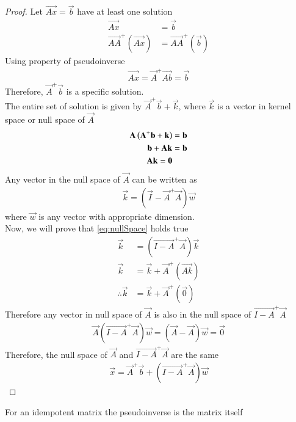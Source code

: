 \documentclass[journal,12pt,twocolumn]{IEEEtran}
\begin{document}
\begin{proof}
Let $\vec{Ax}=\vec{b}$ have at least one solution
\begin{align}
    \vec{Ax}&=\vec{b}\\
    \vec{AA}^+(\vec{Ax})&=\vec{AA}^+(\vec{b})
\end{align}
Using property of pseudoinverse
\begin{align}
    \vec{Ax}=\vec{A}^+\vec{Ab}=\vec{b}
\end{align}
Therefore, $\vec{A}^+\vec{b}$ is a specific solution.\\
The entire set of solution is given by $\vec{A}^+\vec{b}+\vec{k}$, where $\vec{k}$ is a vector in kernel space or null space of $\vec{A}$
\begin{align}
    \mathbf{A}\left(\mathbf{A}^+\mathbf{b}+\mathbf{k}\right)&=\mathbf{b}\\
    \mathbf{b}+\mathbf{Ak}&=\mathbf{b}\\
    \mathbf{Ak}=\mathbf{0}
\end{align}
Any vector in the null space of $\vec{A}$ can be written as
\begin{align}
    \vec{k}=(\vec{I}-\vec{A}^+\vec{A})\vec{w} \label{eq:nullSpace}
\end{align}
where $\vec{w}$ is any vector with appropriate dimension.\\
Now, we will prove that \eqref{eq:nullSpace} holds true
\begin{align}
    \vec{k}&=(\vec{I-A}^+\vec{A})\vec{k}\\
    \vec{k}&=\vec{k}+\vec{A}^+(\vec{Ak})\\
    \therefore \vec{k}&=\vec{k}+\vec{A}^+(\vec{0})
\end{align}
Therefore any vector in null space of $\vec{A}$ is also in the null space of $ \vec{I-A}^+\vec{A} $
\begin{align}
    \vec{A}(\vec{I-A}^+\vec{A})\vec{w}=(\vec{A}-\vec{A})\vec{w}=\vec{0}
\end{align}
Therefore, the null space of $\vec{A}$ and $\vec{I-A}^+\vec{A}$ are the same
\begin{align}
    \vec{x}=\vec{A}^+\vec{b}+(\vec{I-A}^+\vec{A})\vec{w}
\end{align}
\end{proof}
\begin{lemma}
\label{lemma:pseudoinverse}
    For an idempotent matrix the pseudoinverse is the matrix itself
\end{lemma}
\end{document}
